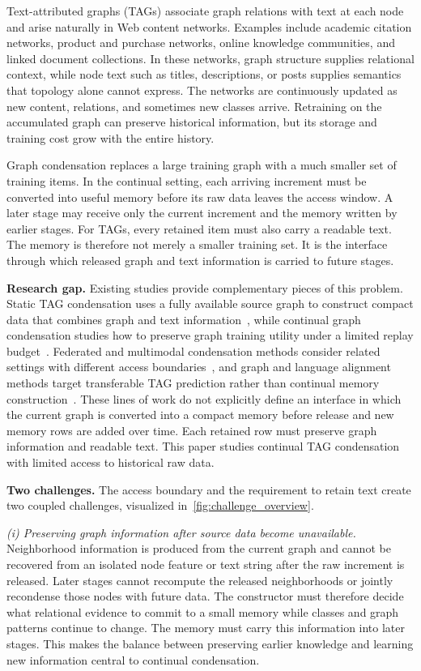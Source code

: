 Text-attributed graphs (TAGs) associate graph relations with text
at each node and arise naturally in Web content networks. Examples
include academic citation networks, product and purchase networks,
online knowledge communities, and linked document collections. In these
networks, graph structure supplies relational context, while node text such
as titles, descriptions, or posts supplies semantics that topology alone
cannot express. The networks are continuously updated as new content,
relations, and sometimes new classes arrive. Retraining on the accumulated
graph can preserve historical information, but its storage and training cost
grow with the entire history.

Graph condensation replaces a large training graph with a much smaller set of
training items. In the continual setting, each arriving increment must be
converted into useful memory before its raw data leaves the access
window. A later stage may receive only the current increment and the memory
written by earlier stages. For TAGs, every retained item must also carry a
readable text. The memory is therefore not merely a smaller training
set. It is the interface through which released graph and text information is
carried to future stages.

\noindent\textbf{Research gap.}
Existing studies provide complementary pieces of this problem. Static TAG
condensation uses a fully available source graph to construct compact data
that combines graph and text information~\cite{tagsam,stad}, while continual graph condensation
studies how to preserve graph training utility under a limited replay
budget~\cite{cat,puma,gecc}. Federated and multimodal condensation methods
consider related settings with different access boundaries~\cite{dance,srgm},
and graph and language alignment methods target transferable TAG prediction
rather than continual memory construction~\cite{graphclip}. These lines of
work do not explicitly define an interface in which the current graph is
converted into a compact memory before release and new memory rows are added
over time. Each retained row must preserve graph information and readable
text. This paper studies continual TAG condensation with limited access to
historical raw data.

\noindent\textbf{Two challenges.}
The access boundary and the requirement to retain text create two coupled challenges,
visualized in~\autoref{fig:challenge_overview}.

\emph{(i) Preserving graph information after source data become unavailable.}
Neighborhood information is produced from the current graph and cannot be
recovered from an isolated node feature or text string after the raw
increment is released. Later stages cannot recompute the released
neighborhoods or jointly recondense those nodes with future data. The
constructor must therefore decide what relational evidence to commit to a
small memory while classes and graph patterns continue to change. The
memory must carry this information into later stages. This makes the
balance between preserving earlier knowledge and learning new information
central to continual condensation.

